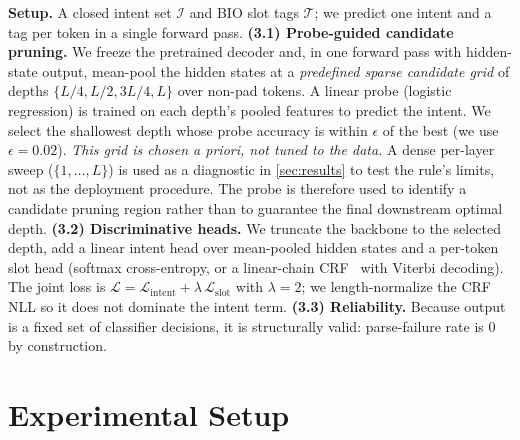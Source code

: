 \documentclass{article}
\begin{document}
\textbf{Setup.} A closed intent set $\mathcal{I}$ and BIO slot tags
$\mathcal{T}$; we predict one intent and a tag per token in a single forward
pass. \textbf{(3.1) Probe-guided candidate pruning.} We freeze the pretrained
decoder and, in one forward pass with hidden-state output, mean-pool the hidden
states at a \emph{predefined sparse candidate grid} of depths
$\{L/4, L/2, 3L/4, L\}$ over non-pad tokens. A linear
probe (logistic regression) is trained on each depth's pooled features to
predict the intent. We select the shallowest depth whose probe accuracy is
within $\epsilon$ of the best (we use $\epsilon=0.02$). \emph{This grid is
chosen a priori, not tuned to the data.} A dense per-layer sweep
($\{1,\ldots,L\}$) is used as a diagnostic in \cref{sec:results} to test the rule's limits,
not as the deployment procedure. The probe is therefore used to identify a
candidate pruning region rather than to guarantee the final downstream
optimal depth. \textbf{(3.2)
Discriminative heads.} We truncate the backbone to the selected depth, add a
linear intent head over mean-pooled hidden states and a per-token slot head
(softmax cross-entropy, or a linear-chain CRF~\citep{lafferty2001crf} with
Viterbi decoding). The joint loss is
$\mathcal{L} = \mathcal{L}_{\text{intent}} + \lambda\,\mathcal{L}_{\text{slot}}$
with $\lambda=2$; we length-normalize the CRF NLL so it does not dominate the
intent term. \textbf{(3.3) Reliability.} Because output is a fixed set of
classifier decisions, it is structurally valid: parse-failure rate is 0 by
construction.

\section{Experimental Setup}\label{sec:setup}
\end{document}
